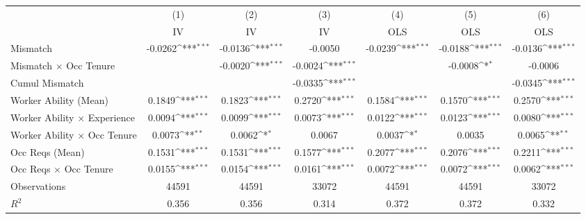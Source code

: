 {
\def\sym#1{\ifmmode^{#1}\else\(^{#1}\)\fi}
\begin{tabular}{l*{6}{c}}
\hline  
                    &\multicolumn{1}{c}{(1)}&\multicolumn{1}{c}{(2)}&\multicolumn{1}{c}{(3)}&\multicolumn{1}{c}{(4)}&\multicolumn{1}{c}{(5)}&\multicolumn{1}{c}{(6)}\\
                    &\multicolumn{1}{c}{IV}&\multicolumn{1}{c}{IV}&\multicolumn{1}{c}{IV}&\multicolumn{1}{c}{OLS}&\multicolumn{1}{c}{OLS}&\multicolumn{1}{c}{OLS}\\
\hline  
Mismatch            &     -0.0262\sym{***}&     -0.0136\sym{***}&     -0.0050         &     -0.0239\sym{***}&     -0.0188\sym{***}&     -0.0136\sym{***}\\
[1em]
Mismatch $\times$ Occ Tenure&                     &     -0.0020\sym{***}&     -0.0024\sym{***}&                     &     -0.0008\sym{*}  &     -0.0006         \\
[1em]
Cumul Mismatch      &                     &                     &     -0.0335\sym{***}&                     &                     &     -0.0345\sym{***}\\
[1em]
Worker Ability (Mean)&      0.1849\sym{***}&      0.1823\sym{***}&      0.2720\sym{***}&      0.1584\sym{***}&      0.1570\sym{***}&      0.2570\sym{***}\\
[1em]
Worker Ability $\times$ Experience&      0.0094\sym{***}&      0.0099\sym{***}&      0.0073\sym{***}&      0.0122\sym{***}&      0.0123\sym{***}&      0.0080\sym{***}\\
[1em]
Worker Ability $\times$ Occ Tenure&      0.0073\sym{**} &      0.0062\sym{*}  &      0.0067         &      0.0037\sym{*}  &      0.0035         &      0.0065\sym{**} \\
[1em]
Occ Reqs (Mean)     &      0.1531\sym{***}&      0.1531\sym{***}&      0.1577\sym{***}&      0.2077\sym{***}&      0.2076\sym{***}&      0.2211\sym{***}\\
[1em]
Occ Reqs $\times$ Occ Tenure&      0.0155\sym{***}&      0.0154\sym{***}&      0.0161\sym{***}&      0.0072\sym{***}&      0.0072\sym{***}&      0.0062\sym{***}\\
\hline  
Observations        &       44591         &       44591         &       33072         &       44591         &       44591         &       33072         \\
\(R^{2}\)           &       0.356         &       0.356         &       0.314         &       0.372         &       0.372         &       0.332         \\
\hline  
\end{tabular}
}
